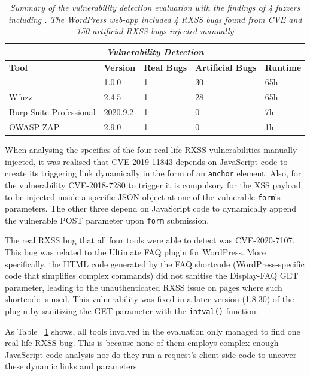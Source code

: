 \begin{table}[ht]
\centering
 \begin{tabular}{@{}|l|l|l|l|l|@{}}
 \hline
  \multicolumn{5}{|c|}{\textit{\textbf{Vulnerability Detection}}} \\
 \hline
 \textbf{Tool} & \textbf{Version} & \textbf{Real Bugs} & \textbf{Artificial Bugs} & \textbf{Runtime} \\ 
 \hline\hline
 \pname{} & 1.0.0 & 1 & 30 & 65h  \\ 
 \hline
 Wfuzz & 2.4.5 & 1 & 28 & 65h  \\ 
 \hline
 Burp Suite Professional & 2020.9.2 & 1 & 0 & 7h \\ 
 \hline
 OWASP ZAP  & 2.9.0 & 1 & 0 & 1h  \\
 \hline
 \end{tabular}
 \captionsetup{justification=centering}
 \caption[Vulnerability detection summary]{\textit{Summary of the vulnerability detection evaluation with the findings of 4 fuzzers including \pname{}. The WordPress web-app included 4 RXSS bugs found from CVE and 150 artificial RXSS bugs injected manually}}

 \label{tools_table}
\end{table}

When analysing the specifics of the four real-life RXSS vulnerabilities manually injected, it was realised that CVE-2019-11843 depends on JavaScript code to create its triggering link dynamically in the form of an {\tt anchor} element. Also, for the vulnerability CVE-2018-7280 to trigger it is compulsory for the XSS payload to be injected inside a specific JSON object at one of the vulnerable {\tt form}'s parameters. The other three depend on JavaScript code to dynamically append the vulnerable POST parameter upon {\tt form} submission. 

The real RXSS bug that all four tools were able to detect was CVE-2020-7107. This bug was related to the Ultimate FAQ plugin for WordPress. More specifically, the HTML code generated by the FAQ shortcode (WordPress-specific code that simplifies complex commands) did not sanitise the Display-FAQ GET parameter, leading to the unauthenticated RXSS issue on pages where such shortcode is used. This vulnerability was fixed in a later version (1.8.30) of the plugin by sanitizing the GET parameter with the {\tt intval()} function. 

As Table ~\ref{tools_table} shows, all tools involved in the evaluation only managed to find one real-life RXSS bug. This is because none of them employs complex enough JavaScript code analysis nor do they run a request's client-side code to uncover these dynamic links and parameters.

